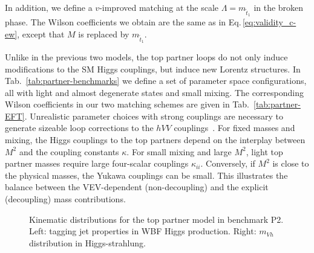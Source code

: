 In addition, we define a $v$-improved matching at the scale $\Lambda =
m_{\tilde{t}_{1}}$ in the broken phase. The Wilson coefficients we
obtain are the same as in Eq.\,\eqref{eq:validity_c-ew}, except that $M$ is
replaced by $m_{\tilde{t}_{1}}$.  

Unlike in the previous two models, the top partner loops do not only
induce modifications to the SM Higgs couplings, but induce new Lorentz
structures.  In Tab.~\ref{tab:partner-benchmarks} we define a set of
parameter space configurations, all with light and almost degenerate
states and small mixing. The corresponding Wilson coefficients in our
two matching schemes are given in Tab.~\ref{tab:partner-EFT}.
Unrealistic parameter choices with strong couplings are necessary to
generate sizeable loop corrections to the $hVV$
couplings~\cite{Hollik:2008xn}. For fixed masses and mixing, the Higgs
couplings to the top partners depend on the interplay between $M^2$
and the coupling constants $\kappa$. For small mixing and large $M^2$,
light top partner masses require large four-scalar couplings
$\kappa_{ii}$.  Conversely, if $M^2$ is close to the physical masses,
the Yukawa couplings can be small.  This illustrates the balance
between the VEV-dependent (non-decoupling) and the explicit
(decoupling) mass contributions.

\begin{figure}[t] \centering
  \caption{Kinematic distributions for the top partner model in
benchmark P2.  Left: tagging jet properties in WBF Higgs production.
Right: $m_{Vh}$ distribution in Higgs-strahlung.}
  \label{fig:validity_partners_distributions}
\end{figure}

